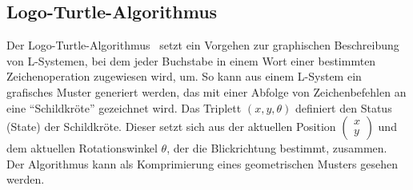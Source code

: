 \subsection*{Logo-Turtle-Algorithmus}
Der Logo-Turtle-Algorithmus~\cite{prusinkiewicz_1986} setzt ein Vorgehen zur graphischen Beschreibung von L-Systemen, bei dem
jeder Buchstabe in einem Wort einer bestimmten Zeichenoperation zugewiesen wird, um.
So kann aus einem L-System ein grafisches Muster generiert werden, das mit einer Abfolge von Zeichenbefehlen an
eine "`Schildkröte"' gezeichnet wird.
Das Triplett $(x,y,\theta)$ definiert den Status (State) der Schildkröte.
Dieser setzt sich aus der aktuellen Position $\left(\begin{smallmatrix} x \\ y \end{smallmatrix}\right)$ und dem
aktuellen Rotationswinkel $\theta$, der die Blickrichtung bestimmt, zusammen.\\
Der Algorithmus kann als Komprimierung eines geometrischen Musters gesehen werden.

\newpage

